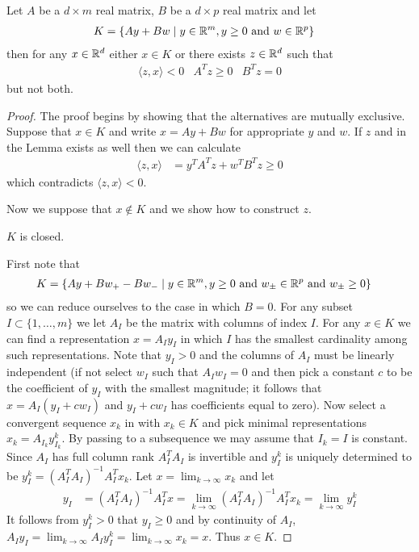 \begin{lem}\label{FarkasLemma}Let $A$ be a $d \times m$ real matrix, $B$ be a $d \times p$ real matrix and let 
\begin{align*}
K &= \lbrace A y + B w \mid y \in \mathbb{R}^m, y \geq 0 \text{ and } w \in \mathbb{R}^p \rbrace
\end{align*}
then for any $x \in \mathbb{R}^d$ either $x \in K$ or there exists $z \in \mathbb{R}^d$ such that 
\begin{align*}
\langle z, x \rangle < 0 & A^T z \geq 0 & B^T z = 0
\end{align*}
but not both.
\end{lem}
\begin{proof}
The proof begins by showing that the alternatives are mutually exclusive.  Suppose that $x \in K$ and write 
$x = A y + B w$ for appropriate $y$ and $w$.  If $z$ and in the Lemma exists as well then we can calculate
\begin{align*}
\langle z, x \rangle &= y^T A^T z + w^T B^T z \geq 0
\end{align*}
which contradicts $\langle z,x \rangle < 0$.

Now we suppose that $x \notin K$ and we show how to construct $z$.  

\begin{clm} $K$ is closed.
\end{clm}
First note that 
\begin{align*}
K &= \lbrace A y + B w_+ - B w_-\mid y \in \mathbb{R}^m, y \geq 0 \text{ and } w_\pm \in \mathbb{R}^p \text{ and } w_\pm \geq 0 \rbrace
\end{align*}
so we can reduce ourselves to the case in which $B = 0$.  For any subset $I \subset \lbrace 1, \dotsc, m \rbrace$ we let $A_I$ be the matrix
with columns of index $I$.  For any $x \in K$ we can find a representation $x = A_I y_I$ in which $I$ has the smallest cardinality among such
representations.  Note that $y_I > 0$ and the columns of $A_I$ must be linearly independent (if not select $w_I$ such that $A_I w_I = 0$ and 
then pick a constant $c$ to be the coefficient of $y_I$ with the smallest magnitude; it follows that $x = A_I (y_I + c w_I)$ and $y_I + c w_I$ has coefficients equal to zero).
Now select a convergent sequence $x_k$ in with $x_k \in K$ and pick minimal representations $x_k = A_{I_k} y^k_{I_k}$.  By passing to a subsequence 
we may assume that $I_k=I$ is constant.  Since $A_I$ has full column rank  $A^T_I A_I$ is invertible and $y^k_I$ is uniquely determined to be
$y^k_I = (A_I^T A_I)^{-1} A^T_I x_k$.  Let $x = \lim_{k \to \infty} x_k$ and let 
\begin{align*}
y_I &= (A_I^T A_I)^{-1} A^T_I x = \lim_{k \to \infty} (A_I^T A_I)^{-1} A^T_I x_k =  \lim_{k \to \infty} y^k_I 
\end{align*}
It follows from $y^k_I > 0$ that $y_I \geq 0$ and by continuity of $A_I$, $A_I y_I = \lim_{k \to \infty} A_I y^k_I =  \lim_{k \to \infty} x_k = x$.  Thus $x \in K$.


\end{proof}
